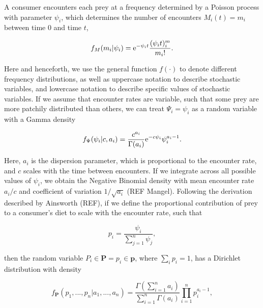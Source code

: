 \documentclass{frontiersSCNS}
\begin{document}
A consumer encounters each prey at a frequency determined by a Poisson process with parameter $\psi_i$, which determines the number of encounters $M_i(t)=m_i$ between time 0 and time $t$,

\begin{equation}
f_M (m_i|\psi_i) = {\rm e}^{-\psi_i t}\frac{(\psi_i t)^m_i}{m_i!}.
\end{equation}

\noindent Here and henceforth, we use the general function $f(\cdot)$ to denote different frequency distributions, as well as uppercase notation to describe stochastic variables, and lowercase notation to describe specific values of stochastic variables.
If we assume that encounter rates are variable, such that some prey are more patchily distributed than others, we can treat $\Psi_i = \psi_i$ as a random variable with a Gamma density

\begin{equation}
f_\Psi (\psi_i | c, a_i) = \frac{c^{a_i}}{\Gamma (a_i)}{\rm e}^{-c \psi_i}\psi_i^{a_i - 1}.
\end{equation}

\noindent Here, $a_i$ is the dispersion parameter, which is proportional to the encounter rate, and $c$ scales with the time between encounters.
If we integrate across all possible values of $\psi_i$, we obtain the Negative Binomial density with mean encounter rate $a_i/c$ and coefficient of variation $1/\sqrt{a_i}$ (REF Mangel).
Following the derivation described by Ainsworth (REF), if we define the proportional contribution of prey to a consumer's diet to scale with the encounter rate, such that

\begin{equation}
  p_i = \frac{\psi_i}{\sum_{j=1}^n \psi_j},
\end{equation}

\noindent then the random variable $P_i \in {\bm P} = p_i \in {\bm p}$, where $\sum_i p_i = 1$, has a Dirichlet distribution with density

\begin{equation}
  f_{\bm P}(p_1,...,p_n|a_1,...,a_n) = \frac{\Gamma(\sum_{i=1}^n a_i)}{\sum_{i=1}^n\Gamma(a_i)}\prod_{i=1}^n p_i^{a_i - 1},
\end{equation}
\end{document}

